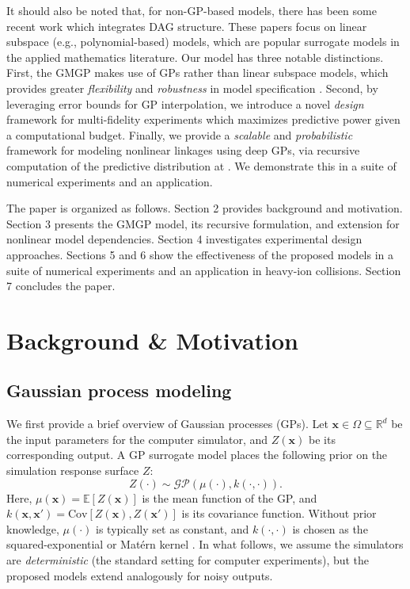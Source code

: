 \documentclass[12pt]{article}
\newcommand{\bs}[1]{\boldsymbol{#1}}
\newcommand{\cbl}[1]{{\color{black}{#1}}}
\begin{document}
It should also be noted that, for non-GP-based models, there has been some recent work \citep{2020mfnets_2,2020mfnets_1} which integrates DAG structure. These papers focus on linear subspace (e.g., polynomial-based) models, which are popular surrogate models in the applied mathematics literature. Our model has three notable distinctions. First, the GMGP makes use of GPs rather than linear subspace models, which provides greater \textit{flexibility} and \textit{robustness} in model specification \citep{gramacy2020surrogates}. Second, by leveraging error bounds for GP interpolation, we introduce a novel \textit{design} framework for multi-fidelity experiments which maximizes predictive power given a computational budget. Finally, we provide a \textit{scalable} and \textit{probabilistic} framework for modeling nonlinear linkages using deep GPs, via recursive computation of the predictive distribution at \cbl{each depth level of the DAG}. We demonstrate this in a suite of numerical experiments and an application.

The paper is organized as follows. Section 2 provides background and motivation. Section 3 presents the GMGP model, its recursive formulation, and extension for nonlinear model dependencies. Section 4 investigates experimental design approaches. Sections 5 and 6 show the effectiveness of the proposed models in a suite of numerical experiments and an application in heavy-ion collisions. Section 7 concludes the paper.

\section{Background \& Motivation}
\label{sec:background}

\subsection{Gaussian process modeling}

We first provide a brief overview of Gaussian processes (GPs). Let $\bs{x} \in \Omega \subseteq \mathbb{R}^d$ be the input parameters for the computer simulator, and $Z(\bs{x})$ be its corresponding output. A GP surrogate model places the following prior on the simulation response surface $Z$:
\[Z(\cdot)\sim \mathcal{GP}(\mu(\cdot),k(\cdot,\cdot)).\]
Here, $\mu(\bs{x}) = \mathbb{E}[Z(\bs{x})]$ is the mean function of the GP, and $k(\bs{x},\bs{x}') = \text{Cov}[Z(\bs{x}),Z(\bs{x}')]$ is its covariance function. Without prior knowledge, $\mu(\cdot)$ is typically set as constant, and $k(\cdot,\cdot)$ is chosen as the squared-exponential or Mat\'ern kernel \citep{gramacy2020surrogates}. In what follows, we assume the simulators are \textit{deterministic}
(the standard setting for computer experiments), but the proposed models extend analogously for noisy outputs.
\end{document}
